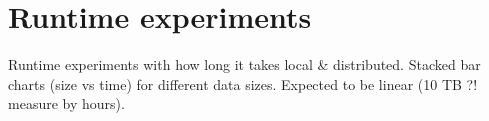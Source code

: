 \section{Runtime experiments}
Runtime experiments with how long it takes local & distributed. 
Stacked bar charts (size vs time) for different data sizes. 
Expected to be linear (10 TB ?! measure by hours).